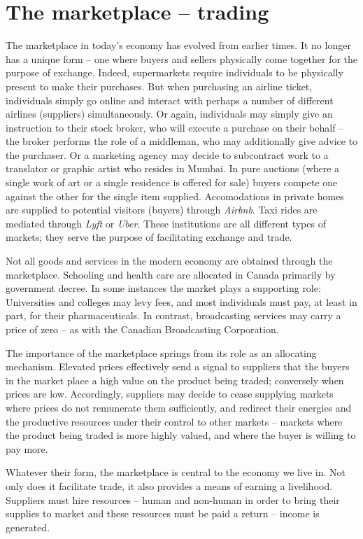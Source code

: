\section{The marketplace -- trading}\label{sec:ch3sec1}

The marketplace in today's economy has evolved from
earlier times. It no longer has a unique form -- one where buyers and
sellers physically come together for the purpose of exchange. Indeed,
supermarkets require individuals to be physically present to make their
purchases. But when purchasing an airline ticket, individuals simply go 
online and interact with perhaps a number of different airlines (suppliers)
simultaneously. Or again, individuals may simply give an instruction to
their stock broker, who will execute a purchase on their behalf -- the
broker performs the role of a middleman, who may additionally give advice to
the purchaser. Or a marketing agency may decide to subcontract work to a
translator or graphic artist who resides in Mumbai. In pure auctions (where
a single work of art or a single residence is offered for sale) buyers
compete one against the other for the single item supplied. Accomodations in
private homes are supplied to potential visitors (buyers) through \textit{%
Airbnb}. Taxi rides are mediated through \textit{Lyft} or \textit{Uber}.
These institutions are all different types of markets; they serve the
purpose of facilitating exchange and trade.

Not all goods and services in the modern
economy are obtained through the marketplace. Schooling and health care are
allocated in Canada primarily by government decree. In some instances the
market plays a supporting role: Universities and colleges may levy fees, and
most individuals must pay, at least in part, for their pharmaceuticals. In contrast,
broadcasting services may carry a price of zero -- as with the Canadian
Broadcasting Corporation.

The importance of the marketplace springs from its role as an allocating
mechanism. Elevated prices effectively send a signal to suppliers that the
buyers in the market place a high value on the product being traded;
conversely when prices are low. Accordingly, suppliers may decide to cease
supplying markets where prices do not remunerate them sufficiently, and
redirect their energies and the productive resources under their control to
other markets -- markets where the product being traded is more highly
valued, and where the buyer is willing to pay more.

Whatever their form, the marketplace is central to the economy we live in.
Not only does it facilitate trade, it also provides a means of earning a
livelihood. Suppliers must hire resources -- human and non-human in order to
bring their supplies to market and these resources must be paid a return --
income is generated.

